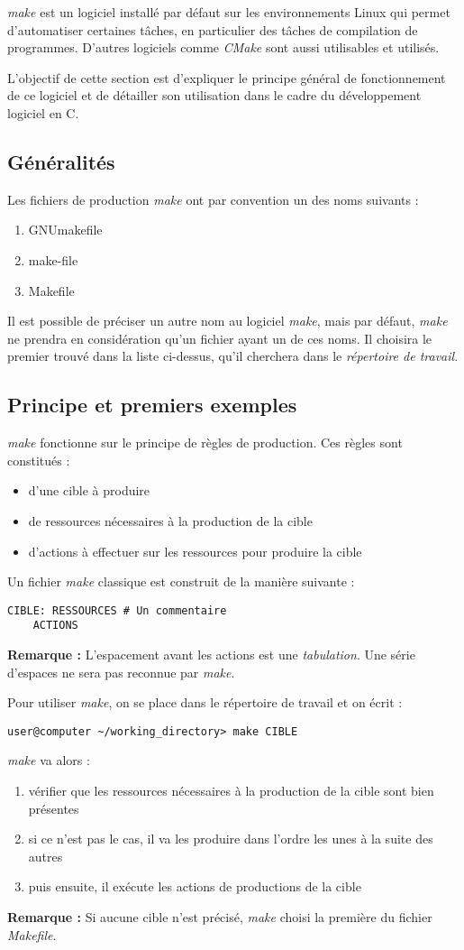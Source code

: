 \documentclass[../../../main.tex]{subfiles}
\begin{document}
\textit{make} est un logiciel installé par défaut sur les environnements Linux qui permet d'automatiser certaines tâches, en particulier des tâches de compilation de programmes. D'autres logiciels comme \textit{CMake} sont aussi utilisables et utilisés.

L'objectif de cette section est d'expliquer le principe général de fonctionnement de ce logiciel et de détailler son utilisation dans le cadre du développement logiciel en C.
\subsection{Généralités}
Les fichiers de production \textit{make} ont par convention un des noms suivants :
\begin{enumerate}
	\item GNUmakefile
	\item make-file
	\item Makefile
\end{enumerate}
Il est possible de préciser un autre nom au logiciel \textit{make}, mais par défaut, \textit{make} ne prendra en considération qu'un fichier ayant un de ces noms. Il choisira le premier trouvé dans la liste ci-dessus, qu'il cherchera dans le \textit{répertoire de travail}.
\subsection{Principe et premiers exemples}
\textit{make} fonctionne sur le principe de règles de production. Ces règles sont constitués :
\begin{itemize}
	\item d'une cible à produire
	\item de ressources nécessaires à la production de la cible
	\item d'actions à effectuer sur les ressources pour produire la cible
\end{itemize}
Un fichier \textit{make} classique est construit de la manière suivante :
\begin{verbatim}
CIBLE: RESSOURCES # Un commentaire
	ACTIONS
\end{verbatim}
\textbf{Remarque :} L'espacement avant les actions est une \textit{tabulation}. Une série d'espaces ne sera pas reconnue par \textit{make}.
 
Pour utiliser \textit{make}, on se place dans le répertoire de travail et on écrit :
\begin{verbatim}
user@computer ~/working_directory> make CIBLE
\end{verbatim}
\textit{make} va alors :
\begin{enumerate}
	\item vérifier que les ressources nécessaires à la production de la cible sont bien présentes
	\item si ce n'est pas le cas, il va les produire dans l'ordre les unes à la suite des autres
	\item puis ensuite, il exécute les actions de productions de la cible
\end{enumerate}
\textbf{Remarque :} Si aucune cible n'est précisé, \textit{make} choisi la première du fichier \textit{Makefile}.
 
\end{document}
